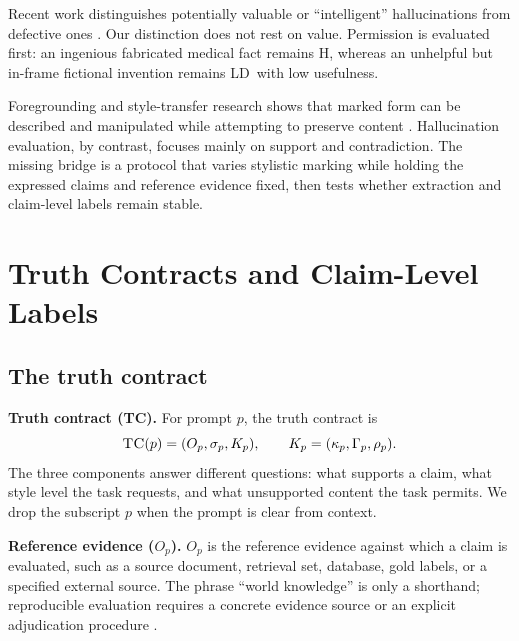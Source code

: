 \documentclass{clv2025}
\newcommand{\TC}{\textsc{TC}}
\newcommand{\LD}{\textsc{LD}}
\newcommand{\Hall}{\textsc{H}}
\begin{document}
Recent work distinguishes potentially valuable or ``intelligent'' hallucinations from defective ones \citep{jiang_survey_2024,sui_confabulation_2024,yang_hicbench_2025}.
Our distinction does not rest on value.
Permission is evaluated first: an ingenious fabricated medical fact remains \Hall, whereas an unhelpful but in-frame fictional invention remains \LD\ with low usefulness.

Foregrounding and style-transfer research shows that marked form can be described and manipulated while attempting to preserve content \citep{leech_short_style_1981,vanpeer_stylistics_2020,pavlick_empirical_2016,rao_dear_2018,briakou_evaluating_2021}.
Hallucination evaluation, by contrast, focuses mainly on support and contradiction.
The missing bridge is a protocol that varies stylistic marking while holding the expressed claims and reference evidence fixed, then tests whether extraction and claim-level labels remain stable.

\section{Truth Contracts and Claim-Level Labels}\label{sec:framework}

\subsection{The truth contract}

\textbf{Truth contract (\TC).}
For prompt $p$, the truth contract is
\[
  \TC(p)=(O_p,\sigma_p,K_p), \qquad K_p=(\kappa_p,\Gamma_p,\rho_p).
\]
The three components answer different questions: what supports a claim, what style level the task requests, and what unsupported content the task permits.
We drop the subscript $p$ when the prompt is clear from context.

\textbf{Reference evidence ($O_p$).}
$O_p$ is the reference evidence against which a claim is evaluated, such as a source document, retrieval set, database, gold labels, or a specified external source.
The phrase ``world knowledge'' is only a shorthand; reproducible evaluation requires a concrete evidence source or an explicit adjudication procedure \citep{ji_survey_2023,bang_hallulens_2025}.
\end{document}
